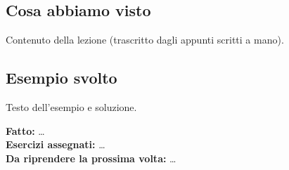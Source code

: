 


\subsection{Cosa abbiamo visto}

Contenuto della lezione (trascritto dagli appunti scritti a mano).

\subsection{Esempio svolto}

Testo dell'esempio e soluzione.

\begin{sintesi}
\textbf{Fatto:} \dots\\
\textbf{Esercizi assegnati:} \dots\\
\textbf{Da riprendere la prossima volta:} \dots
\end{sintesi}


